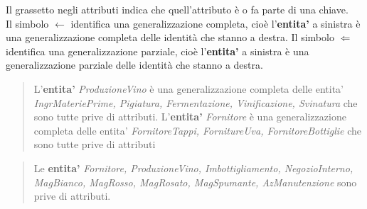 Il grassetto negli attributi indica che quell'attributo è o fa parte di una chiave. \\
Il simbolo $\gets$ identifica una generalizzazione completa, cioè l'\textbf{entita'} a sinistra è una generalizzazione completa delle identità che stanno a destra.
Il simbolo $\Leftarrow$ identifica una generalizzazione parziale, cioè l'\textbf{entita'} a sinistra è una generalizzazione parziale delle identità che stanno a destra.

\begin{verse}
	L'\textbf{entita'} \emph{ProduzioneVino} è una generalizzazione completa delle entita' \emph{IngrMateriePrime, Pigiatura, Fermentazione, Vinificazione, Svinatura} che sono tutte prive di attributi.
	L'\textbf{entita'} \emph{Fornitore}  è una generalizzazione completa delle entita' \emph{FornitoreTappi, FornitureUva, FornitoreBottiglie} che sono tutte prive di attributi
\end{verse}
\begin{verse}
	Le \textbf{entita'} \emph{Fornitore, ProduzioneVino, Imbottigliamento, NegozioInterno, MagBianco, MagRosso, MagRosato, MagSpumante, AzManutenzione} sono prive di attributi.
\end{verse}

